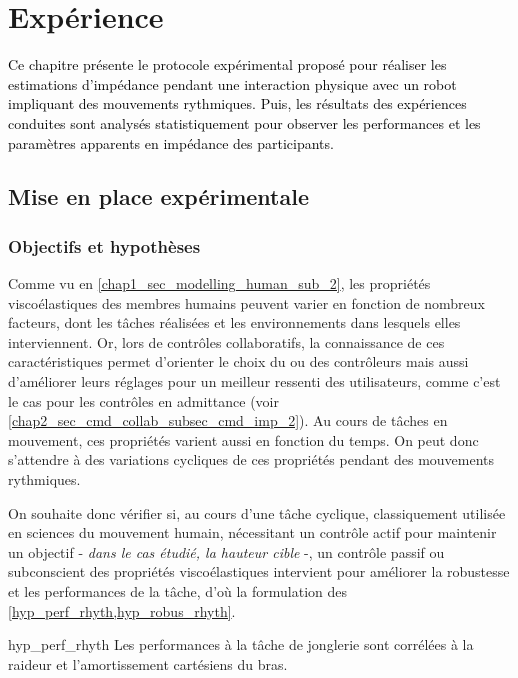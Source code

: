 \chapter{Expérience} \label{chap4}
\minitoc
\textcolor{black}{Ce chapitre présente le protocole expérimental proposé pour réaliser les estimations d'impédance pendant une interaction physique avec un robot impliquant des mouvements rythmiques.	Puis, les résultats des expériences conduites sont analysés statistiquement pour observer les performances et les paramètres apparents en impédance des participants.}

\section{Mise en place expérimentale} \label{chap4_sec_exp}


\subsection{Objectifs et hypothèses} \label{chap4_sec_exp_sub_hypothese}

Comme vu en \cref{chap1_sec_modelling_human_sub_2}, les propriétés viscoélastiques des membres humains peuvent varier en fonction de nombreux facteurs, dont les tâches réalisées et les environnements dans lesquels elles interviennent. Or, lors de contrôles collaboratifs, la connaissance de ces caractéristiques permet d'orienter le choix du ou des contrôleurs mais aussi d'améliorer leurs réglages pour un meilleur ressenti des utilisateurs, comme c'est le cas pour les contrôles en admittance (voir \cref{chap2_sec_cmd_collab_subsec_cmd_imp_2}). Au cours de tâches en mouvement, ces propriétés varient aussi en fonction du temps. On peut donc s'attendre à des variations cycliques de ces propriétés pendant des mouvements rythmiques.

On souhaite donc vérifier si, au cours d'une tâche cyclique, classiquement utilisée en sciences du mouvement humain, nécessitant un contrôle actif pour maintenir un objectif -\textit{ dans le cas étudié, la hauteur cible }-, un contrôle passif ou subconscient des propriétés viscoélastiques intervient pour améliorer la robustesse et les performances de la tâche, d'où la formulation des \cref{hyp_perf_rhyth,hyp_robus_rhyth}.

\begin{hypotheses}{}{hyp_perf_rhyth}
	Les performances à la tâche de jonglerie sont corrélées à la raideur et l'amortissement cartésiens du bras.
\end{hypotheses}

